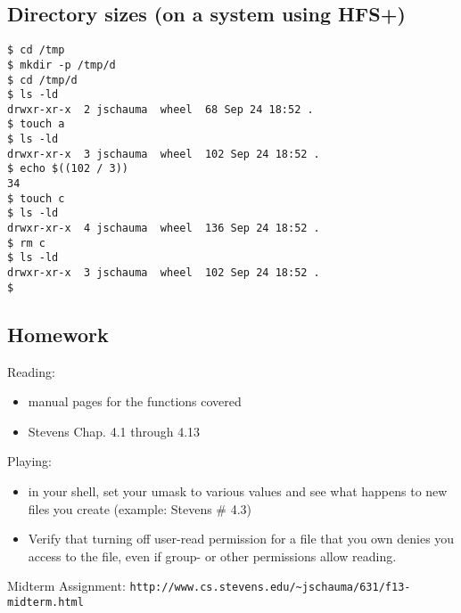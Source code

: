 \documentclass[xga]{xdvislides}
\begin{document}
\subsection{Directory sizes (on a system using HFS+)}
\begin{verbatim}
$ cd /tmp
$ mkdir -p /tmp/d
$ cd /tmp/d
$ ls -ld
drwxr-xr-x  2 jschauma  wheel  68 Sep 24 18:52 .
$ touch a
$ ls -ld
drwxr-xr-x  3 jschauma  wheel  102 Sep 24 18:52 .
$ echo $((102 / 3))
34
$ touch c
$ ls -ld
drwxr-xr-x  4 jschauma  wheel  136 Sep 24 18:52 .
$ rm c
$ ls -ld
drwxr-xr-x  3 jschauma  wheel  102 Sep 24 18:52 .
$
\end{verbatim}

\subsection{Homework}
Reading:
\begin{itemize}
	\item manual pages for the functions covered
	\item Stevens Chap. 4.1 through 4.13
\end{itemize}
Playing:
\begin{itemize}
	\item in your shell, set your umask to various values and see what
          happens to new files you create (example: Stevens \# 4.3)
	\item Verify that turning off user-read permission for a file that you own
		denies you access to the file, even if group- or other permissions
		allow reading.
\end{itemize}
\addvspace{.5in}
Midterm Assignment:
\verb+http://www.cs.stevens.edu/~jschauma/631/f13-midterm.html+
\end{document}
